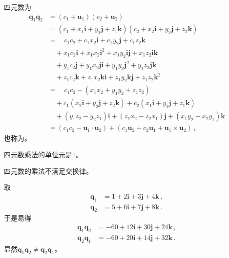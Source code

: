 \begin{definition}
    四元数为
    \begin{align}
        {\bm q}_1{\bm q}_2 & =(c_1+{\bm u}_1)(c_2+{\bm u}_2)\nonumber                                                                      \\
                           & =(c_1+x_1\mathbf{i}+y_1\mathbf{j}+z_1\mathbf{k})(c_2+x_2\mathbf{i}+y_2\mathbf{j}+z_2\mathbf{k})\nonumber      \\
                           & =\quad c_1c_2+c_1x_2\mathbf{i}+c_1y_2\mathbf{j}+c_1z_2\mathbf{k}\nonumber                                     \\
                           & \quad +x_1c_2\mathbf{i}+x_1x_2\mathbf{i}^2+x_1y_2\mathbf{i}\mathbf{j}+x_1z_2\mathbf{i}\mathbf{k}\nonumber     \\
                           & \quad +y_1c_2\mathbf{j}+y_1x_2\mathbf{j}\mathbf{i}+y_1y_2\mathbf{j}^2+y_1z_2\mathbf{j}\mathbf{k}\nonumber     \\
                           & \quad +z_1c_2\mathbf{k}+z_1x_2\mathbf{k}\mathbf{i}+z_1y_2\mathbf{k}\mathbf{j}+z_1z_2\mathbf{k}^2\nonumber     \\
                           & =\quad c_1c_2-(x_1x_2+y_1y_2+z_1z_2)\nonumber                                                                 \\
                           & \quad +c_1(x_2\mathbf{i}+y_2\mathbf{j}+z_2\mathbf{k})+c_2(x_1\mathbf{i}+y_1\mathbf{j}+z_1\mathbf{k})\nonumber \\
                           & \quad +(y_1z_2-y_2z_1)\mathbf{i}+(z_1x_2-z_2x_1)\mathbf{j}+(x_1y_2-x_2y_1)\mathbf{k}\nonumber                 \\
                           & =(c_1c_2-{\bm u}_1\cdot{\bm u}_2)+(c_1{\bm u}_2+c_2{\bm u}_1+{\bm u}_1\times{\bm u}_2)\, ,
    \end{align}
    也称为。
\end{definition}
\begin{proposition}
    四元数乘法的单位元是$1$。
\end{proposition}
\begin{proposition}
    四元数的乘法不满足交换律。
\end{proposition}
\begin{example}
    取
    \begin{align}
        {\bm q}_1 & =1+2\mathbf{i}+3\mathbf{j}+4\mathbf{k}\, , \\
        {\bm q}_2 & =5+6\mathbf{i}+7\mathbf{j}+8\mathbf{k}\, .
    \end{align}
    于是易得
    \begin{align}
        {\bm q}_1{\bm q}_2 & =-60+12\mathbf{i}+30\mathbf{j}+24\mathbf{k}\, , \\
        {\bm q}_2{\bm q}_1 & =-60+20\mathbf{i}+14\mathbf{j}+32\mathbf{k}\, .
    \end{align}
    显然${\bm q}_1{\bm q}_2\neq{\bm q}_2{\bm q}_1$。
\end{example}
